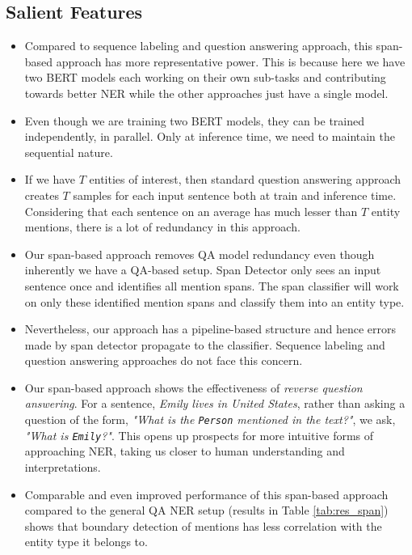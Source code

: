 \subsection{Salient Features}

\begin{itemize}
    \item Compared to sequence labeling and question answering approach, this span-based approach has more representative power. This is because here we have two BERT models each working on their own sub-tasks and contributing towards better NER while the other approaches just have a single model.
    
    \item Even though we are training two BERT models, they can be trained independently, in parallel. Only at inference time, we need to maintain the sequential nature.
    
    \item If we have $T$ entities of interest, then standard question answering approach creates $T$ samples for each input sentence both at train and inference time. Considering that each sentence on an average has much lesser than $T$ entity mentions, there is a lot of redundancy in this approach. 
    
    \item Our span-based approach removes QA model redundancy even though inherently we have a QA-based setup. Span Detector only sees an input sentence once and identifies all mention spans. The span classifier will work on only these identified mention spans and classify them into an entity type.
    
    \item Nevertheless, our approach has a pipeline-based structure and hence errors made by span detector propagate to the classifier. Sequence labeling and question answering approaches do not face this concern. 
    
    \item Our span-based approach shows the effectiveness of \textit{reverse question answering}. For a sentence, \textit{Emily lives in United States}, rather than asking a question of the form, \textit{"What is the \texttt{Person} mentioned in the text?"}, we ask, \textit{"What is \texttt{Emily}?"}. This opens up prospects for more intuitive forms of approaching NER, taking us closer to human understanding and interpretations.
    
    \item Comparable and even improved performance of this span-based approach compared to the general QA NER setup (results in Table \ref{tab:res_span}) shows that boundary detection of mentions has less correlation with the entity type it belongs to.
\end{itemize}
